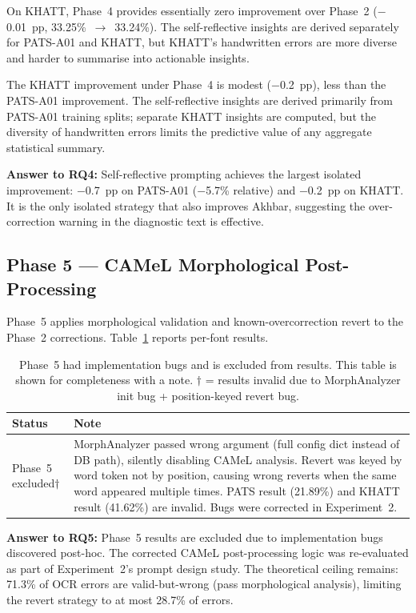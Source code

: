 On KHATT, Phase~4 provides essentially zero improvement over Phase~2
($-$0.01~pp, 33.25\%~$\to$~33.24\%). The self-reflective insights are
derived separately for PATS-A01 and KHATT, but KHATT's handwritten errors
are more diverse and harder to summarise into actionable insights.

The KHATT improvement under Phase~4 is modest ($-$0.2~pp), less than the
PATS-A01 improvement. The self-reflective insights are derived primarily from
PATS-A01 training splits; separate KHATT insights are computed, but the
diversity of handwritten errors limits the predictive value of any aggregate
statistical summary.

\textbf{Answer to RQ4:} Self-reflective prompting achieves the largest
isolated improvement: $-$0.7~pp on PATS-A01 ($-$5.7\% relative) and
$-$0.2~pp on KHATT. It is the only isolated strategy that also improves
Akhbar, suggesting the over-correction warning in the diagnostic text is
effective.

\subsection{Phase 5 --- CAMeL Morphological Post-Processing}
\label{subsec:res_p5}

Phase~5 applies morphological validation and known-overcorrection revert
to the Phase~2 corrections. Table~\ref{tab:p5_per_font} reports per-font
results.

\begin{table}[htbp]
  \centering
  \caption{Phase~5 had implementation bugs and is excluded from results.
           This table is shown for completeness with a note. $\dagger$ = results
           invalid due to MorphAnalyzer init bug + position-keyed revert bug.}
  \label{tab:p5_per_font}
  \begin{tabularx}{\textwidth}{lX}
    \toprule
    \textbf{Status} & \textbf{Note} \\
    \midrule
    Phase~5 excluded$\dagger$ & MorphAnalyzer passed wrong argument (full config dict instead
    of DB path), silently disabling CAMeL analysis. Revert was keyed by
    word token not by position, causing wrong reverts when the same word
    appeared multiple times. PATS result (21.89\%) and KHATT result (41.62\%)
    are invalid. Bugs were corrected in Experiment~2. \\
    \bottomrule
  \end{tabularx}
\end{table}

\textbf{Answer to RQ5:} Phase~5 results are excluded due to implementation
bugs discovered post-hoc. The corrected CAMeL post-processing logic was
re-evaluated as part of Experiment~2's prompt design study.
The theoretical ceiling remains: 71.3\% of OCR errors are valid-but-wrong
(pass morphological analysis), limiting the revert strategy to at most
28.7\% of errors.

